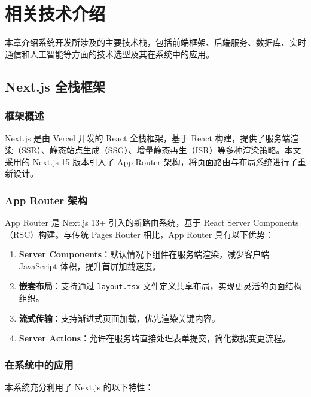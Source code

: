 \section{相关技术介绍}

本章介绍系统开发所涉及的主要技术栈，包括前端框架、后端服务、数据库、实时通信和人工智能等方面的技术选型及其在系统中的应用。

\subsection{Next.js 全栈框架}

\subsubsection{框架概述}

Next.js 是由 Vercel 开发的 React 全栈框架，基于 React 构建，提供了服务端渲染（SSR）、静态站点生成（SSG）、增量静态再生（ISR）等多种渲染策略。本文采用的 Next.js 15 版本引入了 App Router 架构，将页面路由与布局系统进行了重新设计。

\subsubsection{App Router 架构}

App Router 是 Next.js 13+ 引入的新路由系统，基于 React Server Components（RSC）构建。与传统 Pages Router 相比，App Router 具有以下优势：

\begin{enumerate}[label=(\arabic*)]
  \item \textbf{Server Components}：默认情况下组件在服务端渲染，减少客户端 JavaScript 体积，提升首屏加载速度。
  \item \textbf{嵌套布局}：支持通过 \texttt{layout.tsx} 文件定义共享布局，实现更灵活的页面结构组织。
  \item \textbf{流式传输}：支持渐进式页面加载，优先渲染关键内容。
  \item \textbf{Server Actions}：允许在服务端直接处理表单提交，简化数据变更流程。
\end{enumerate}

\subsubsection{在系统中的应用}

本系统充分利用了 Next.js 的以下特性：

